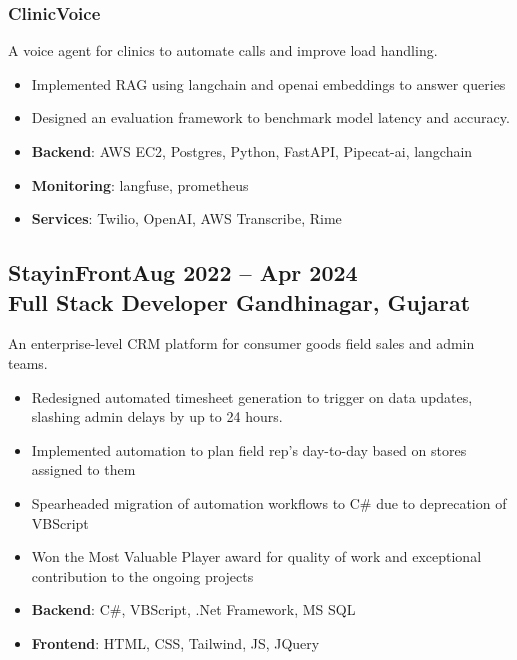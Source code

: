 \documentclass[a4paper]{article}
\newcommand{\experiencetitle}[4]{\subsection{\texorpdfstring{#1\hfill \small \textmd{#4} \\
	\textmd{#3} \hfill \textmd{#2}}{#1}}}
\begin{document}
\subsubsection{ClinicVoice}
A voice agent for clinics to automate calls and improve load handling.
\begin{itemize}
	\item Implemented RAG using langchain and openai embeddings to answer queries
	\item Designed an evaluation framework to benchmark model latency and accuracy.
	\item \textbf{Backend}: AWS EC2, Postgres, Python, FastAPI, Pipecat-ai, langchain
	\item \textbf{Monitoring}: langfuse, prometheus
	\item \textbf{Services}: Twilio, OpenAI, AWS Transcribe, Rime
\end{itemize}


\experiencetitle
{StayinFront}{Gandhinagar, Gujarat}
{Full Stack Developer}{Aug 2022 -- Apr 2024}
An enterprise-level CRM platform for consumer goods field sales and admin teams.
\begin{itemize}
	\item Redesigned automated timesheet generation to trigger on data updates, slashing admin delays by up to 24 hours.
	\item Implemented automation to plan field rep's day-to-day based on stores assigned to them
	\item Spearheaded migration of automation workflows to C\# due to deprecation of VBScript
	\item Won the Most Valuable Player award for quality of work and exceptional contribution to the ongoing projects
	\item \textbf{Backend}: C\#, VBScript, .Net Framework, MS SQL
	\item \textbf{Frontend}: HTML, CSS, Tailwind, JS, JQuery
\end{itemize}


\end{document}
